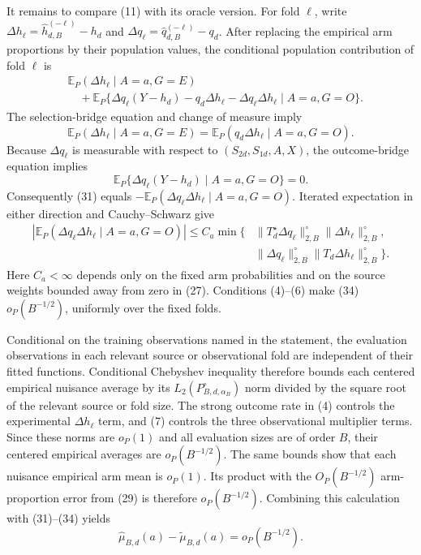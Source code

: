 It remains to compare (11) with its oracle version.  For fold \(\ell\), write \(\Delta h_\ell=\widehat h_{d,B}^{(-\ell)}-h_d\) and \(\Delta q_\ell=\widehat q_{d,B}^{(-\ell)}-q_d\).  After replacing the empirical arm proportions by their population values, the conditional population contribution of fold \(\ell\) is
\[
\begin{aligned}
 &\mathbb E_P(\Delta h_\ell\mid A=a,G=E)\\
 &\quad+\mathbb E_P\{\Delta q_\ell(Y-h_d)-q_d\Delta h_\ell
                -\Delta q_\ell\Delta h_\ell\mid A=a,G=O\}.
\end{aligned}                                                \tag{31}
\]
The selection-bridge equation and change of measure imply
\[
 \mathbb E_P(\Delta h_\ell\mid A=a,G=E)
 =\mathbb E_P(q_d\Delta h_\ell\mid A=a,G=O).                \tag{32}
\]
Because \(\Delta q_\ell\) is measurable with respect to \((S_{2d},S_{1d},A,X)\), the outcome-bridge equation implies
\[
 \mathbb E_P\{\Delta q_\ell(Y-h_d)\mid A=a,G=O\}=0.         \tag{33}
\]
Consequently (31) equals \(-\mathbb E_P(\Delta q_\ell\Delta h_\ell\mid A=a,G=O)\).  Iterated expectation in either direction and Cauchy--Schwarz give
\[
\begin{aligned}
 |\mathbb E_P(\Delta q_\ell\Delta h_\ell\mid A=a,G=O)|
 \le C_a\min\{&
 \|T_d^\star\Delta q_\ell\|_{2,B}^{\circ}
 \|\Delta h_\ell\|_{2,B}^{\circ},\\
 &\|\Delta q_\ell\|_{2,B}^{\circ}
 \|T_d\Delta h_\ell\|_{2,B}^{\circ}\}.
\end{aligned}                                                \tag{34}
\]
Here \(C_a<\infty\) depends only on the fixed arm probabilities and on the source weights bounded away from zero in (27).  Conditions (4)--(6) make (34) \(o_P(B^{-1/2})\), uniformly over the fixed folds.

Conditional on the training observations named in the statement, the evaluation observations in each relevant source or observational fold are independent of their fitted functions.  Conditional Chebyshev inequality therefore bounds each centered empirical nuisance average by its \(L_2(P_{B,d,\alpha_B}^{\circ})\) norm divided by the square root of the relevant source or fold size.  The strong outcome rate in (4) controls the experimental \(\Delta h_\ell\) term, and (7) controls the three observational multiplier terms.  Since these norms are \(o_P(1)\) and all evaluation sizes are of order \(B\), their centered empirical averages are \(o_P(B^{-1/2})\).  The same bounds show that each nuisance empirical arm mean is \(o_P(1)\).  Its product with the \(O_P(B^{-1/2})\) arm-proportion error from (29) is therefore \(o_P(B^{-1/2})\).  Combining this calculation with (31)--(34) yields
\[
 \widehat\mu_{B,d}(a)-\widetilde\mu_{B,d}(a)=o_P(B^{-1/2}). \tag{35}
\]

